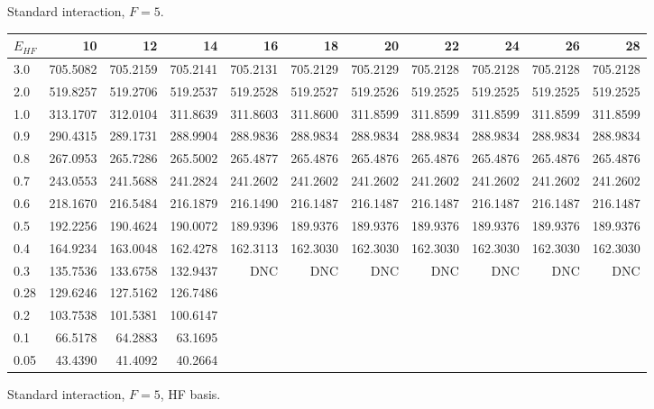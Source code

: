 \begin{landscape}
\begin{table}
\begin{center}
Standard interaction, $F=5$.\\
\begin{tabular}{l|rrrrrrrrrr}
\hline 
$E_{HF}$ & 10 & 12 & 14 & 16 & 18 & 20 & 22 & 24 & 26 & 28 \\
\hline \hline
3.0 & 705.5082 & 705.2159 & 705.2141 & 705.2131 & 705.2129 & 705.2129 & 705.2128 & 705.2128 & 705.2128 & 705.2128 \\ 
2.0 & 519.8257 & 519.2706 & 519.2537 & 519.2528 & 519.2527 & 519.2526 & 519.2525 & 519.2525 & 519.2525 & 519.2525 \\ 
1.0 & 313.1707 & 312.0104 & 311.8639 & 311.8603 & 311.8600 & 311.8599 & 311.8599 & 311.8599 & 311.8599 & 311.8599 \\ 
0.9 & 290.4315 & 289.1731 & 288.9904 & 288.9836 & 288.9834 & 288.9834 & 288.9834 & 288.9834 & 288.9834 & 288.9834 \\ 
0.8 & 267.0953 & 265.7286 & 265.5002 & 265.4877 & 265.4876 & 265.4876 & 265.4876 & 265.4876 & 265.4876 & 265.4876 \\ 
0.7 & 243.0553 & 241.5688 & 241.2824 & 241.2602 & 241.2602 & 241.2602 & 241.2602 & 241.2602 & 241.2602 & 241.2602 \\ 
0.6 & 218.1670 & 216.5484 & 216.1879 & 216.1490 & 216.1487 & 216.1487 & 216.1487 & 216.1487 & 216.1487 & 216.1487 \\ 
0.5 & 192.2256 & 190.4624 & 190.0072 & 189.9396 & 189.9376 & 189.9376 & 189.9376 & 189.9376 & 189.9376 & 189.9376 \\ 
0.4 & 164.9234 & 163.0048 & 162.4278 & 162.3113 & 162.3030 & 162.3030 & 162.3030 & 162.3030 & 162.3030 & 162.3030 \\ 
0.3 & 135.7536 & 133.6758 & 132.9437 & DNC & DNC & DNC & DNC & DNC & DNC & DNC \\
0.28 & 129.6246 & 127.5162 & 126.7486  \\ 
0.2 & 103.7538 & 101.5381 & 100.6147  \\ 
0.1 & 66.5178 & 64.2883 & 63.1695  \\ 
0.05 & 43.4390 & 41.4092 & 40.2664  \\ 
\hline \hline
\end{tabular}
\end{center}
\end{table}
\begin{table}
\begin{center}
Standard interaction, $F=5$, HF basis.\\

\end{center}
\end{table}
\end{landscape}
